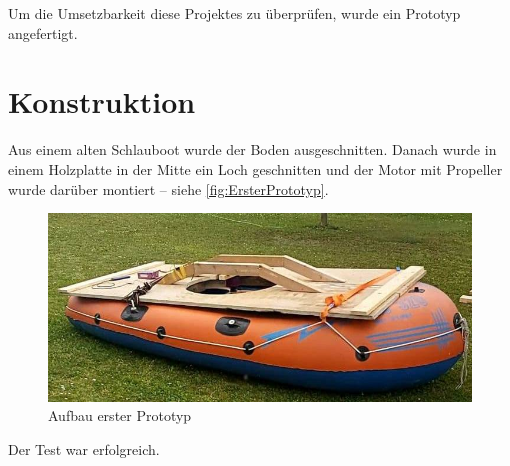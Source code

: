 Um die Umsetzbarkeit diese Projektes zu überprüfen, wurde ein Prototyp angefertigt.

\section{Konstruktion}
Aus einem alten Schlauboot wurde der Boden ausgeschnitten. Danach wurde in einem Holzplatte in der Mitte ein Loch geschnitten und der Motor mit Propeller wurde darüber montiert -- siehe \autoref{fig:ErsterPrototyp}.
\begin{figure}[h!]
  \centering
  \includegraphics[width=.95\textwidth]{./Aufbau1.jpg}
  \caption{Aufbau erster Prototyp}
  \label{fig:ErsterPrototyp}
\end{figure}

Der Test war erfolgreich.
